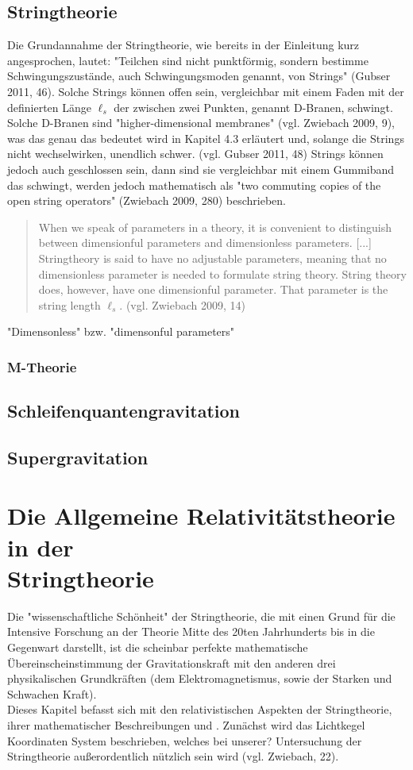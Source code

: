 \documentclass[a4paper,11pt]{article}
\begin{document}
\subsection{Stringtheorie}
Die Grundannahme der Stringtheorie, wie bereits in der Einleitung kurz angesprochen, lautet: "Teilchen sind nicht punktförmig, sondern bestimme Schwingungszustände, auch Schwingungsmoden genannt, von Strings" (Gubser 2011, 46). Solche Strings können offen sein, vergleichbar mit einem Faden mit der definierten Länge $\ell_s$ der zwischen zwei Punkten, genannt D-Branen, schwingt. Solche D-Branen sind "higher-dimensional membranes" (vgl. Zwiebach 2009, 9), was das genau das bedeutet wird in Kapitel 4.3 erläutert und, solange die Strings nicht wechselwirken, unendlich schwer. (vgl. Gubser 2011, 48) Strings können jedoch auch geschlossen sein, dann sind sie vergleichbar mit einem Gummiband das schwingt, werden jedoch mathematisch als "two commuting copies of the open string operators" (Zwiebach 2009, 280) beschrieben.  
\begin{quote}
When we speak of parameters in a theory, it is convenient to distinguish between dimensionful parameters and dimensionless parameters. [...] Stringtheory is said to have no adjustable parameters, meaning that no dimensionless parameter is needed to formulate string theory. String theory does, however, have one dimensionful parameter. That parameter is the string length $\ell_s$. (vgl. Zwiebach 2009, 14)\\
\end{quote}

\noindent "Dimensonless" bzw. "dimensonful parameters" 
\subsubsection{M-Theorie}

\subsection{Schleifenquantengravitation}

\subsection{Supergravitation}

\newpage
\section{Die Allgemeine Relativitätstheorie in der \\ Stringtheorie}
Die "wissenschaftliche Schönheit" der Stringtheorie, die mit einen Grund für die Intensive Forschung an der Theorie Mitte des 20ten Jahrhunderts bis in die Gegenwart darstellt, ist die scheinbar perfekte mathematische Übereinscheinstimmung der Gravitationskraft mit den anderen drei physikalischen Grundkräften (dem Elektromagnetismus, sowie der Starken und Schwachen Kraft).  \\
Dieses Kapitel befasst sich mit den relativistischen Aspekten der Stringtheorie, ihrer mathematischer Beschreibungen und . Zunächst wird das Lichtkegel Koordinaten System beschrieben, welches bei unserer? Untersuchung der Stringtheorie außerordentlich nützlich sein wird (vgl. Zwiebach, 22).  
\end{document}
